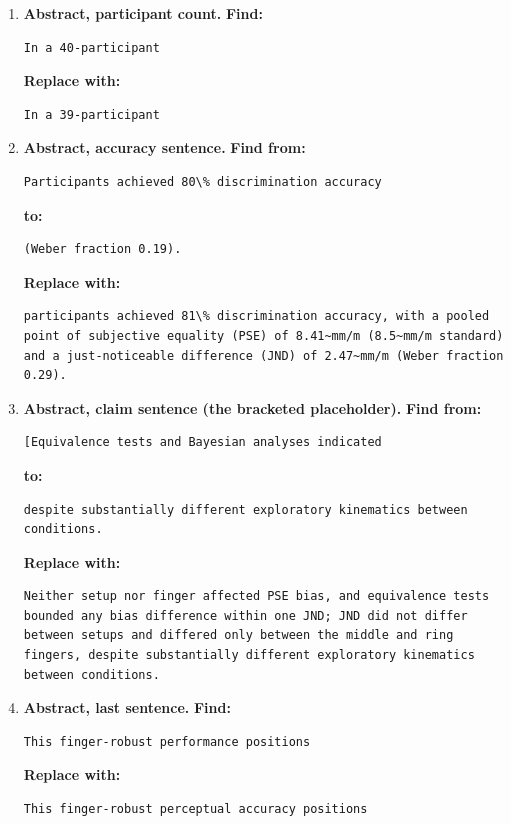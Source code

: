\documentclass[11pt,a4paper]{article}
\newcommand{\replace}{\noindent\textbf{Replace with:}\par\nopagebreak}
\begin{document}
\begin{enumerate}
\item \textbf{Abstract, participant count.}
\noindent\textbf{Find:}\begin{lstlisting}
In a 40-participant
\end{lstlisting}
\replace
\begin{lstlisting}
In a 39-participant
\end{lstlisting}

\item \textbf{Abstract, accuracy sentence.}
\noindent\textbf{Find from:}\begin{lstlisting}
Participants achieved 80\% discrimination accuracy
\end{lstlisting}
\noindent\textbf{to:}\begin{lstlisting}
(Weber fraction 0.19).
\end{lstlisting}
\replace
\begin{lstlisting}
participants achieved 81\% discrimination accuracy, with a pooled point of subjective equality (PSE) of 8.41~mm/m (8.5~mm/m standard) and a just-noticeable difference (JND) of 2.47~mm/m (Weber fraction 0.29).
\end{lstlisting}

\item \textbf{Abstract, claim sentence (the bracketed placeholder).}
\noindent\textbf{Find from:}\begin{lstlisting}
[Equivalence tests and Bayesian analyses indicated
\end{lstlisting}
\noindent\textbf{to:}\begin{lstlisting}
despite substantially different exploratory kinematics between conditions.
\end{lstlisting}
\replace
\begin{lstlisting}
Neither setup nor finger affected PSE bias, and equivalence tests bounded any bias difference within one JND; JND did not differ between setups and differed only between the middle and ring fingers, despite substantially different exploratory kinematics between conditions.
\end{lstlisting}

\item \textbf{Abstract, last sentence.}
\noindent\textbf{Find:}\begin{lstlisting}
This finger-robust performance positions
\end{lstlisting}
\replace
\begin{lstlisting}
This finger-robust perceptual accuracy positions
\end{lstlisting}


\end{enumerate}
\end{document}
